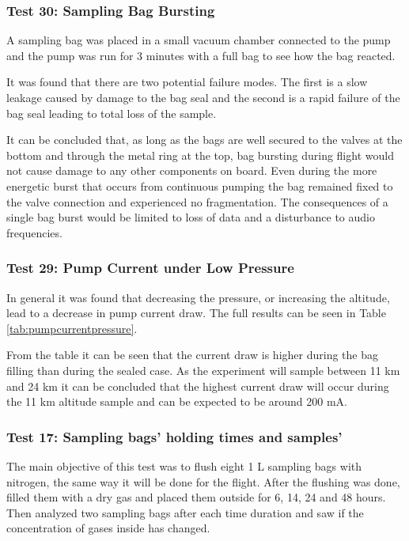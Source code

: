 \subsubsection{Test 30: Sampling Bag Bursting}
\label{sec:test30result}

A sampling bag was placed in a small vacuum chamber connected to the pump and the pump was run for 3 minutes with a full bag to see how the bag reacted. 

It was found that there are two potential failure modes. The first is a slow leakage caused by damage to the bag seal and the second is  a rapid failure of the bag seal leading to total loss of the sample.

It can be concluded that, as long as the bags are well secured to the valves at the bottom and through the metal ring at the top, bag bursting during flight would not cause damage to any other components on board. Even during the more energetic burst that occurs from continuous pumping the bag remained fixed to the valve connection and experienced no fragmentation. The consequences of a single bag burst would be limited to loss of data and a disturbance to audio frequencies. 

\subsubsection{Test 29: Pump Current under Low Pressure}
\label{sec:test29result}

In general it was found that decreasing the pressure, or increasing the altitude, lead to a decrease in pump current draw. The full results can be seen in Table \ref{tab:pumpcurrentpressure}. 



From the table it can be seen that the current draw is higher during the bag filling than during the sealed case. As the experiment will sample between 11 km and 24 km it can be concluded that the highest current draw will occur during the 11 km altitude sample and can be expected to be around 200 mA. 

\subsubsection{Test 17: Sampling bags' holding times and samples'}
\label{sec:test17result}

The main objective of this test was to flush eight 1 L sampling bags with nitrogen, the same way it will be done for the flight. After the flushing was done, filled them with a dry gas and placed them outside for 6, 14, 24 and 48 hours. Then analyzed two sampling bags after each time duration and saw if the concentration of gases inside has changed. 

